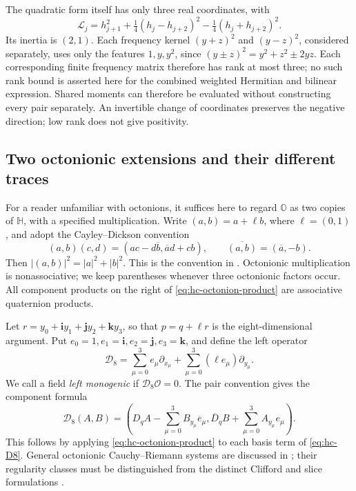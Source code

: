 \documentclass[11pt]{article}
\numberwithin{equation}{section}
\theoremstyle{definition}
\theoremstyle{remark}
\newcommand{\HH}{\mathbb H}
\newcommand{\OO}{\mathbb O}
\newcommand{\ii}{\mathbf i}
\newcommand{\jj}{\mathbf j}
\newcommand{\kk}{\mathbf k}
\newcommand{\Lag}{\mathcal L}
\begin{document}
The quadratic form itself has only three real coordinates, with
\begin{equation}
 \Lag_j=h_{j+1}^2+\tfrac14(h_j-h_{j+2})^2
                         -\tfrac14(h_j+h_{j+2})^2.
 \label{eq:hc-inertia}
\end{equation}
Its inertia is \((2,1)\).  Each frequency kernel
\((y+z)^2\) and \((y-z)^2\), considered separately, uses only the
features \(1,y,y^2\), since \((y\pm z)^2=y^2+z^2\pm2yz\).
Each corresponding finite frequency matrix therefore has rank at most
three; no such rank bound is asserted here for the combined weighted
Hermitian and bilinear expression.
Shared moments can therefore be evaluated without constructing every
pair separately.  An invertible change of coordinates preserves the
negative direction; low rank does not give positivity.

\subsection{Two octonionic extensions and their different traces}

For a reader unfamiliar with octonions, it suffices here to regard
\(\OO\) as two copies of \(\HH\), with a specified multiplication.
Write \((a,b)=a+\ell b\), where \(\ell=(0,1)\), and adopt the
Cayley--Dickson convention
\begin{equation}
 (a,b)(c,d)=(ac-d\overline b,\overline a d+cb),
 \qquad \overline{(a,b)}=(\overline a,-b).
 \label{eq:hc-octonion-product}
\end{equation}
Then \(|(a,b)|^2=|a|^2+|b|^2\). This is the convention in
\cite[Section 2.2]{baez}. Octonionic multiplication is nonassociative;
we keep parentheses whenever three octonionic factors occur. All
component products on the right of \eqref{eq:hc-octonion-product} are
associative quaternion products.

Let \(r=y_0+\ii y_1+\jj y_2+\kk y_3\), so that
\(p=q+\ell r\) is the eight-dimensional argument. Put
\(e_0=1,e_1=\ii,e_2=\jj,e_3=\kk\), and define the left operator
\begin{equation}
 \mathcal D_8=\sum_{\mu=0}^3e_\mu\partial_{x_\mu}
                    +\sum_{\mu=0}^3(\ell e_\mu)\partial_{y_\mu}.
 \label{eq:hc-D8}
\end{equation}
We call a field \emph{left monogenic} if \(\mathcal D_8\mathcal O=0\).
The pair convention gives the component formula
\begin{equation}
 \mathcal D_8(A,B)=
 \left(D_qA-\sum_{\mu=0}^3B_{y_\mu}\overline e_\mu,
       \overline D_qB+\sum_{\mu=0}^3A_{y_\mu}e_\mu\right).
 \label{eq:hc-D8-components}
\end{equation}
This follows by applying \eqref{eq:hc-octonion-product} to each basis
term of \eqref{eq:hc-D8}.  General octonionic Cauchy--Riemann systems
are discussed in \cite{kauhanenorelma}; their regularity classes must
be distinguished from the distinct Clifford and slice formulations
\cite[Proposition 3.5 and Section 4]{kauhanenorelma19}.
\end{document}

